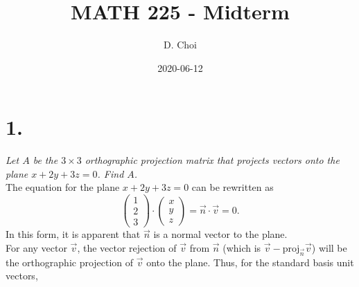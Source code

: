 \documentclass[12pt]{article}
\title{\vspace{-2\baselineskip}MATH 225 - Midterm}
\author{D. Choi}
\date{2020-06-12}
\begin{document}
\maketitle

\section*{1.}
\textit{Let $A$ be the $3 \times 3$ orthographic projection matrix that
projects vectors onto the plane $x + 2y + 3z = 0$. Find $A$.}
\\[\baselineskip]
The equation for the plane $x + 2y + 3z = 0$ can be rewritten as
\begin{equation*}
	\begin{pmatrix} 1 \\ 2 \\ 3 \end{pmatrix}
	\cdot
	\begin{pmatrix} x \\ y \\ z \end{pmatrix}
	= \vec{n} \cdot \vec{v}
	= 0
	.
\end{equation*}
In this form, it is apparent that $\vec{n}$ is a normal vector to the plane.
\\
For any vector $\vec{v}$, the vector rejection of $\vec{v}$ from $\vec{n}$
(which is $\vec{v} - \text{proj}_{\vec{n}}\vec{v}$) will be the orthographic
projection of $\vec{v}$ onto the plane. Thus, for the standard basis unit
vectors,
\end{document}
